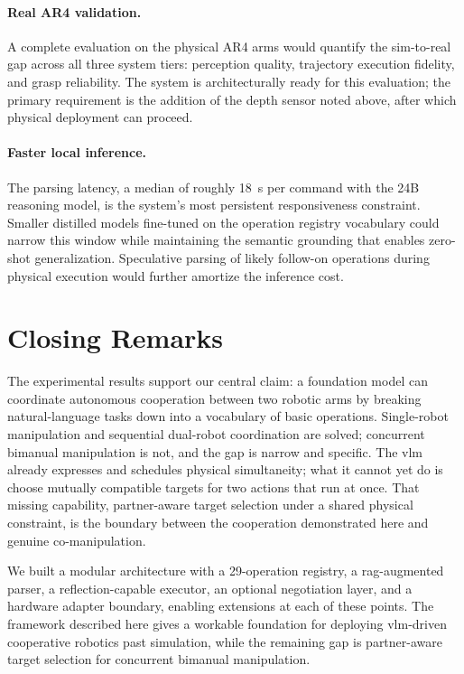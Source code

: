 \documentclass[
     12pt,
     a4paper,
     BCOR=10mm,
     DIV=14,
     listof=totoc,
     bibliography=totoc,
     parskip,
     twoside,
     headsepline
     ]{scrreprt}
\begin{document}
\paragraph{Real AR4 validation.} A complete evaluation on the physical AR4 arms would quantify the sim-to-real gap across all three system tiers: perception quality, trajectory execution fidelity, and grasp reliability. The system is architecturally ready for this evaluation; the primary requirement is the addition of the depth sensor noted above, after which physical deployment can proceed.

\paragraph{Faster local inference.} The parsing latency, a median of roughly 18~s per command with the 24B reasoning model, is the system's most persistent responsiveness constraint. Smaller distilled models fine-tuned on the operation registry vocabulary could narrow this window while maintaining the semantic grounding that enables zero-shot generalization. Speculative parsing of likely follow-on operations during physical execution would further amortize the inference cost.

\section{Closing Remarks}
The experimental results support our central claim: a foundation model can coordinate autonomous cooperation between two robotic arms by breaking natural-language tasks down into a vocabulary of basic operations. Single-robot manipulation and sequential dual-robot coordination are solved; concurrent bimanual manipulation is not, and the gap is narrow and specific. The \gls{vlm} already expresses and schedules physical simultaneity; what it cannot yet do is choose mutually compatible targets for two actions that run at once. That missing capability, partner-aware target selection under a shared physical constraint, is the boundary between the cooperation demonstrated here and genuine co-manipulation.

We built a modular architecture with a 29-operation registry, a \gls{rag}-augmented parser, a reflection-capable executor, an optional negotiation layer, and a hardware adapter boundary, enabling extensions at each of these points. The framework described here gives a workable foundation for deploying \gls{vlm}-driven cooperative robotics past simulation, while the remaining gap is partner-aware target selection for concurrent bimanual manipulation.
\end{document}
